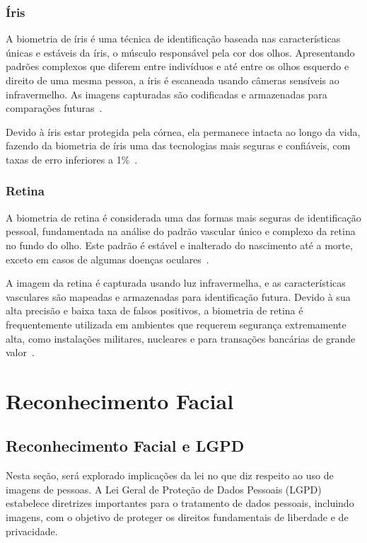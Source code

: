 \subsubsection{Íris}\label{subsubsec:iris}
A biometria de íris é uma técnica de identificação baseada nas características únicas e estáveis da íris, o músculo responsável pela cor dos olhos.
Apresentando padrões complexos que diferem entre indivíduos e até entre os olhos esquerdo e direito de uma mesma pessoa, a íris é escaneada usando câmeras sensíveis ao infravermelho.
As imagens capturadas são codificadas e armazenadas para comparações futuras~\cite{de2020biometria}.

Devido à íris estar protegida pela córnea, ela permanece intacta ao longo da vida, fazendo da biometria de íris uma das tecnologias mais seguras e confiáveis, com taxas de erro inferiores a 1\%~\cite{de2020biometria}.

\subsubsection{Retina}\label{subsubsec:retina}
A biometria de retina é considerada uma das formas mais seguras de identificação pessoal, fundamentada na análise do padrão vascular único e complexo da retina no fundo do olho.
Este padrão é estável e inalterado do nascimento até a morte, exceto em casos de algumas doenças oculares~\cite{de2020biometria}.

A imagem da retina é capturada usando luz infravermelha, e as características vasculares são mapeadas e armazenadas para identificação futura.
Devido à sua alta precisão e baixa taxa de falsos positivos, a biometria de retina é frequentemente utilizada em ambientes que requerem segurança extremamente alta, como instalações militares, nucleares e para transações bancárias de grande valor~\cite{de2020biometria}.


\section{Reconhecimento Facial}\label{sec:reconhecimento-facial}

\subsection{Reconhecimento Facial e LGPD}\label{subsec:lgpd}
Nesta seção, será explorado implicações da lei no que diz respeito ao uso de imagens de pessoas.
A Lei Geral de Proteção de Dados Pessoais (LGPD) estabelece diretrizes importantes para o tratamento de dados pessoais, incluindo imagens, com o objetivo de proteger os direitos fundamentais de liberdade e de privacidade.

